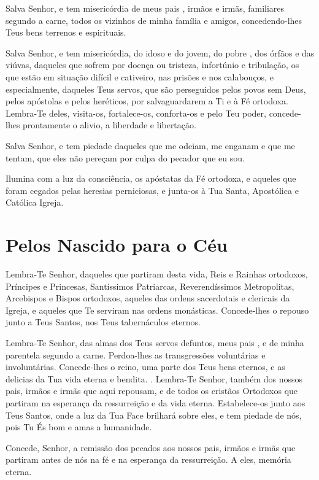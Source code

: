 \documentclass{subfiles}
\begin{document}
Salva Senhor, e tem misericórdia de meus pais \names, irmãos e irmãs,
familiares segundo a carne, todos os vizinhos de minha família e amigos,
concedendo-lhes Teus bens terrenos e espirituais. \metanoia{}

Salva Senhor, e tem misericórdia, do idoso e do jovem, do pobre , dos órfãos e
das viúvas, daqueles que sofrem por doença ou tristeza, infortúnio e tribulação,
os que estão em situação difícil e cativeiro, nas prisões e nos calabouços, e
especialmente, daqueles Teus servos, que são perseguidos pelos povos sem Deus,
pelos apóstolas e pelos heréticos, por salvaguardarem a Ti e à Fé ortodoxa.
Lembra-Te deles, visita-os, fortalece-os, conforta-os e pelo Teu poder,
concede-lhes prontamente o alivio, a liberdade e libertação. \metanoia{}

Salva Senhor, e tem piedade daqueles que me odeiam, me enganam e que me tentam,
que eles não pereçam por culpa do pecador que eu sou. \metanoia{}

Ilumina com a luz da consciência, os apóstatas da Fé ortodoxa, e aqueles que
foram cegados pelas heresias perniciosas, e junta-os à Tua Santa, Apostólica e
Católica Igreja. \metanoia{}

\section*{Pelos Nascido para o Céu}

Lembra-Te Senhor, daqueles que partiram desta vida, Reis e Rainhas ortodoxos,
Príncipes e Princesas, Santíssimos Patriarcas, Reverendíssimos Metropolitas,
Arcebispos e Bispos ortodoxos, aqueles das ordens sacerdotais e clericais da
Igreja, e aqueles que Te serviram nas ordens monásticas. Concede-lhes o repouso
junto a Teus Santos, nos Teus tabernáculos eternos. \metanoia{}

Lembra-Te Senhor, das almas dos Teus servos defuntos, meus pais \names, e de
minha parentela segundo a carne. Perdoa-lhes as transgressões voluntárias e
involuntárias. Concede-lhes o reino, uma parte dos Teus bens eternos, e as
delicias da Tua vida eterna e bendita. \metanoia{}. Lembra-Te Senhor,
também dos nossos pais, irmãos e irmãs que aqui repousam, e de todos os cristãos
Ortodoxos que partiram na esperança da ressurreição e da vida eterna.
Estabelece-os junto aos Teus Santos, onde a luz da Tua Face brilhará sobre eles,
e tem piedade de nós, pois Tu És bom e amas a humanidade. \metanoia{}

Concede, Senhor, a remissão dos pecados aos nossos pais, irmãos e irmãs que
partiram antes de nós na fé e na esperança da ressurreição. A eles, memória
eterna. \metanoia{}
\end{document}
